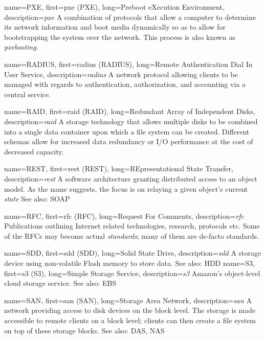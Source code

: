 {
	name={PXE},
	first={\acrlong{pxe} (PXE)},
	long={Preboot eXecution Environment},
	description={{\em \acrlong{pxe}} A combination of protocols
that allow a computer to determine its network information and boot media
dynamically so as to allow for bootstrapping the system over the network.
This process is also known as {\em pxebooting}.}
}

{
	name={RADIUS},
	first={\acrlong{radius} (RADIUS)},
	long={Remote Authentication Dial In User Service},
	description={{\em \acrlong{radius}} A network
protocol allowing clients to be managed with regards to authentication,
authorization, and accounting via a central service.}
}

{
	name={RAID},
	first={\acrlong{raid} (RAID)},
	long={Redundant Array of Independent Disks},
	description={{\em \acrlong{raid}} A storage
technology that allows multiple disks to be combined into a single data
container upon which a file system can be created.  Different schemas allow
for increased data redundancy or I/O performance at the cost of decreased
capacity.}
}

{
	name={REST},
	first={\acrlong{rest} (REST)},
	long={REpresentational State Transfer},
	description={{\em \acrlong{rest}} A software architecture
granting distributed access to an object model.  As the name suggests, the
focus is on relaying a given object's current {\em state} See also: SOAP}
}

{
	name={RFC},
	first={\acrlong{rfc} (RFC)},
	long={Request For Comments},
	description={{\em \acrlong{rfc}} Publications outlining Internet
related technologies, research, protocols etc.  Some of the RFCs may
become actual {\em standards}; many of them are de-facto standards.}
}

{
	name={SDD},
	first={\acrlong{sdd} (SDD)},
	long={Solid State Drive},
	description={{\em \acrlong{sdd}} A
storage device using non-volatile Flash memory to
store data.  See also: HDD}
}
{
	name={S3},
	first={\acrlong{s3} (S3)},
	long={Simple Storage Service},
	description={{\em \acrlong{s3}} Amazon's object-level cloud storage
service.  See also: EBS}
}

{
	name={SAN},
	first={\acrlong{san} (SAN)},
	long={Storage Area Network},
	description={{\em \acrlong{san}} A network providing access to disk
devices on the block level.  The storage is made accessible to remote
clients on a block level; clients can then create a file system on top of
these storage blocks.  See also: DAS, NAS}
}

